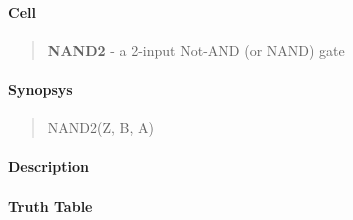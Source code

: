 \label{NAND2}
\paragraph{Cell}
\begin{quote}
    \textbf{NAND2} - a 2-input Not-AND (or NAND) gate
\end{quote}

\paragraph{Synopsys}
\begin{quote}
    NAND2(Z, B, A)
\end{quote}

\paragraph{Description}



\paragraph{Truth Table}



